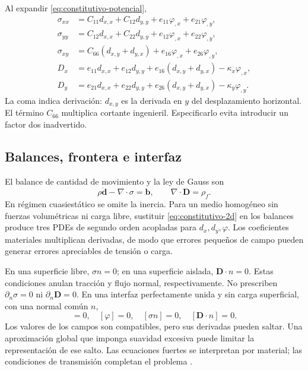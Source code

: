 Al expandir \eqref{eq:constitutivo-potencial},
\begin{align}
\sigma_{xx}&=C_{11}d_{x,x}+C_{12}d_{y,y}+e_{11}\varphi_{,x}+e_{21}\varphi_{,y},\\
\sigma_{yy}&=C_{12}d_{x,x}+C_{22}d_{y,y}+e_{12}\varphi_{,x}+e_{22}\varphi_{,y},\\
\sigma_{xy}&=C_{66}(d_{x,y}+d_{y,x})+e_{16}\varphi_{,x}+e_{26}\varphi_{,y},\\
D_x&=e_{11}d_{x,x}+e_{12}d_{y,y}+e_{16}(d_{x,y}+d_{y,x})-\kappa_x\varphi_{,x},\\
D_y&=e_{21}d_{x,x}+e_{22}d_{y,y}+e_{26}(d_{x,y}+d_{y,x})-\kappa_y\varphi_{,y}.
\label{eq:constitutivo-2d}
\end{align}
La coma indica derivación: $d_{x,y}$ es la derivada en $y$ del desplazamiento horizontal. El término $C_{66}$ multiplica cortante ingenieril. Especificarlo evita introducir un factor dos inadvertido.

\subsection{Balances, frontera e interfaz}
El balance de cantidad de movimiento y la ley de Gauss son
\begin{equation}
\rho\ddot{\mathbf d}-\nabla\cdot\sigma=\mathbf b,
\qquad \nabla\cdot\mathbf D=\rho_f.
\end{equation}
En régimen cuasiestático se omite la inercia. Para un medio homogéneo sin fuerzas volumétricas ni carga libre, sustituir \eqref{eq:constitutivo-2d} en los balances produce tres PDEs de segundo orden acopladas para $d_x,d_y,\varphi$. Los coeficientes materiales multiplican derivadas, de modo que errores pequeños de campo pueden generar errores apreciables de tensión o carga.

En una superficie libre, $\sigma n=0$; en una superficie aislada, $\mathbf D\cdot n=0$. Estas condiciones anulan tracción y flujo normal, respectivamente. No prescriben $\partial_n\sigma=0$ ni $\partial_n\mathbf D=0$. En una interfaz perfectamente unida y sin carga superficial, con una normal común $n$,
\begin{equation}
[\mathbf d]=0,\quad[\varphi]=0,\quad[\sigma n]=0,\quad[\mathbf D\cdot n]=0.
\label{eq:interfaz}
\end{equation}
Los valores de los campos son compatibles, pero sus derivadas pueden saltar. Una aproximación global que imponga suavidad excesiva puede limitar la representación de ese salto. Las ecuaciones fuertes se interpretan por material; las condiciones de transmisión completan el problema \cite{lahmer2008}.

